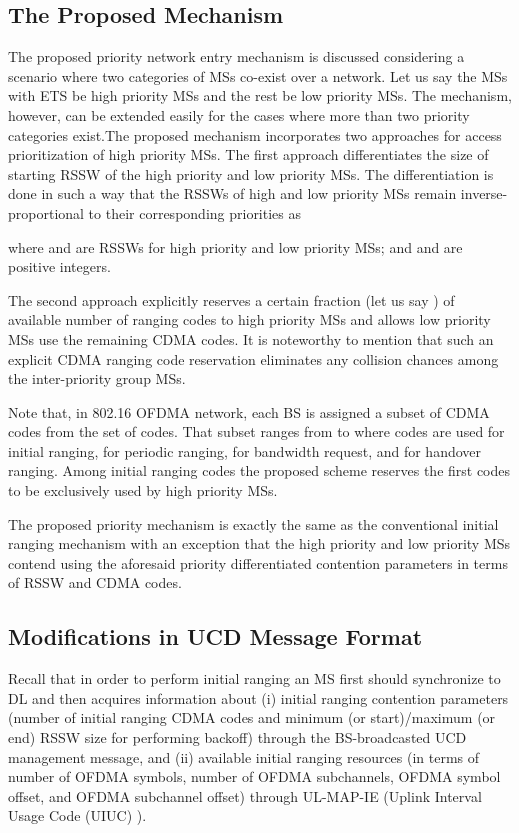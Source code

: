 \documentclass[preprint,12pt]{elsarticle}
\begin{document}
\subsection{The Proposed Mechanism}

The proposed priority network entry mechanism is discussed considering a scenario where two categories of MSs co-exist over a network. Let us say the MSs with ETS be high priority MSs and the rest be low priority MSs. The mechanism, however, can be extended easily for the cases where more than two priority categories exist.The proposed mechanism incorporates two approaches for access prioritization of high priority MSs. The first approach differentiates the size of starting RSSW of the high priority and low priority MSs. The differentiation is done in such a way that the RSSWs of high and low priority MSs remain inverse-proportional to their corresponding priorities as


\noindent where  and  are RSSWs for high priority and low priority MSs; and  and  are positive integers.

The second approach explicitly reserves a certain fraction (let us say ) of available number of ranging codes to high priority MSs and allows low priority MSs use the remaining CDMA codes. It is noteworthy to mention that such an explicit CDMA ranging code reservation eliminates any collision chances among the inter-priority group MSs.

Note that, in 802.16 OFDMA network, each BS is assigned a subset of CDMA codes from the set of  codes. That subset ranges from  to  where   codes are used for initial ranging,   for periodic ranging,   for bandwidth request, and   for handover ranging. Among   initial ranging codes the proposed scheme reserves the first   codes to be exclusively used by high priority MSs.

The proposed priority mechanism is exactly the same as the conventional initial ranging mechanism with an exception that the high priority and low priority MSs contend using the aforesaid priority differentiated contention parameters in terms of RSSW and CDMA codes.

\subsection{Modifications in UCD Message Format}

Recall that in order to perform initial ranging an MS first should synchronize to DL and then  acquires information about (i) initial ranging contention parameters  (number of initial ranging CDMA codes and minimum (or start)/maximum (or end) RSSW size for performing backoff) through the BS-broadcasted UCD management message, and (ii) available initial ranging resources (in terms of number of OFDMA symbols, number of OFDMA subchannels, OFDMA symbol offset, and OFDMA subchannel offset) through UL-MAP-IE (Uplink Interval Usage Code (UIUC) ).
\end{document}
